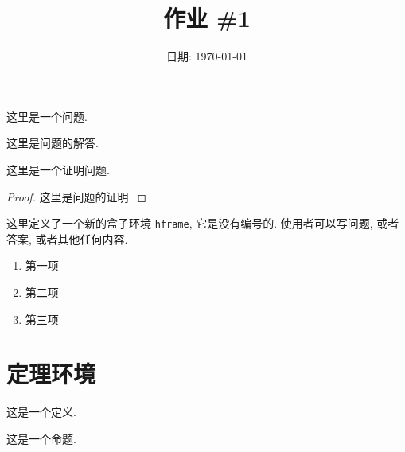 \documentclass[cn,12pt]{homework}
\title{作业 \#1} %
\date{日期: \today} %
\institute{XX 大学 XX 学院} %
\begin{document}
\maketitle




\begin{problem}
这里是一个问题.
\end{problem}

\begin{solution}
这里是问题的解答.
\end{solution}


\begin{problem}
这里是一个证明问题.
\end{problem}

\begin{proof}
这里是问题的证明.
\end{proof}


\begin{hframe}
这里定义了一个新的盒子环境 \verb|hframe|, 它是没有编号的.
使用者可以写问题, 或者答案, 或者其他任何内容.
\begin{enumerate}
  \item 第一项
  \item 第二项
  \item 第三项
\end{enumerate}
\end{hframe}



\section*{定理环境}

\begin{definition}\label{def:foo}
这是一个定义.
\end{definition}

\begin{proposition}\label{prop:foo}
这是一个命题.
\end{proposition}
\end{document}
